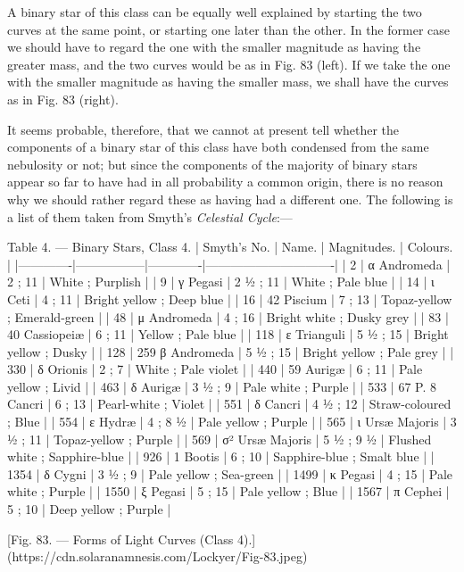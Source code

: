 \documentclass[a4paper, 12pt, oneside, polutonikogreek, english]{article}
\begin{document}
A binary star of this class can be equally well explained by starting the two curves at the same point, or starting one later than the other. In the former case we should have to regard the one with the smaller magnitude as having the greater mass, and the two curves would be as in Fig. 83 (left). If we take the one with the smaller magnitude as having the smaller mass, we shall have the curves as in Fig. 83 (right).

It seems probable, therefore, that we cannot at present tell whether the components of a binary star of this class have both condensed from the same nebulosity or not; but since the components of the majority of binary stars appear so far to have had in all probability a common origin, there is no reason why we should rather regard these as having had a different one. The following is a list of them taken from Smyth's \emph{Celestial Cycle}:---

Table 4. --- Binary Stars, Class 4. 
| Smyth’s No. | Name.      | Magnitudes. | Colours.           |
|-------------|-----------------|-------------|-------------------------------|
| 2      | α Andromeda   | 2 ; 11   | White ; Purplish       |
| 9      | γ Pegasi    | 2 ½ ; 11  | White ; Pale blue       |
| 14     | ι Ceti     | 4 ; 11   | Bright yellow ; Deep blue   |
| 16     | 42 Piscium   | 7 ; 13   | Topaz-yellow ; Emerald-green |
| 48     | μ Andromeda   | 4 ; 16   | Bright white ; Dusky grey   |
| 83     | 40 Cassiopeiæ  | 6 ; 11   | Yellow ; Pale blue      |
| 118     | ε Trianguli   | 5 ½ ; 15  | Bright yellow ; Dusky     |
| 128     | 259 β Andromeda | 5 ½ ; 15  | Bright yellow ; Pale grey   |
| 330     | δ Orionis    | 2 ; 7    | White ; Pale violet      |
| 440     | 59 Aurigæ    | 6 ; 11   | Pale yellow ; Livid      |
| 463     | δ Aurigæ    | 3 ½ ; 9   | Pale white ; Purple      |
| 533     | 67 P. 8 Cancri | 6 ; 13   | Pearl-white ; Violet     |
| 551     | δ Cancri    | 4 ½ ; 12  | Straw-coloured ; Blue     |
| 554     | ε Hydræ     | 4 ; 8 ½   | Pale yellow ; Purple     |
| 565     | ι Ursæ Majoris | 3 ½ ; 11  | Topaz-yellow ; Purple     |
| 569     | σ² Ursæ Majoris | 5 ½ ; 9 ½  | Flushed white ; Sapphire-blue |
| 926     | 1 Bootis    | 6 ; 10   | Sapphire-blue ; Smalt blue  |
| 1354    | δ Cygni     | 3 ½ ; 9   | Pale yellow ; Sea-green    |
| 1499    | κ Pegasi    | 4 ; 15   | Pale white ; Purple      |
| 1550    | ξ Pegasi    | 5 ; 15   | Pale yellow ; Blue      |
| 1567    | π Cephei    | 5 ; 10   | Deep yellow ; Purple     |

[Fig. 83. --- Forms of Light Curves (Class 4).](https://cdn.solaranamnesis.com/Lockyer/Fig-83.jpeg)
\end{document}

